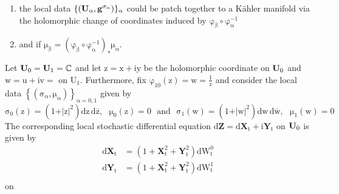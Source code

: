 \documentclass[10 pt,english]{smfart}
\newcommand{\Xt}{\mathrm{\mathbf{X}}_{t}}
\newcommand{\Yt}{\mathrm{\mathbf{Y}}_{t}}
\newcommand{\Z}{\mathrm{\mathbf{Z}}}
\newcommand{\g}{\mathrm{\mathbf{g}}}
\newcommand{\U}{{\bf{U}}}
\begin{document}
\begin{enumerate}
\item the local data $\mathrm{\{\left(\U_{\alpha},\g^{\sigma_{\alpha}}\right)\}_{\alpha}}$ could be patch together to a K\"ahler manifold via the holomorphic change of coordinates induced by $\mathrm{\varphi_{\beta}\circ\varphi^{-1}_{\alpha}}$ 
\item and if $\mathrm{\mu_{\beta}= \left(\varphi_{\beta}\circ\varphi^{-1}_{\alpha}\right)_{*}\mu_{\alpha}}$.
\end{enumerate}

\begin{exem} Let $\mathrm{\U_{0}=\U_{1}=\mathbb{C}}$ and let $\mathrm{z=x+iy}$ be the holomorphic coordinate on $\mathrm{\U_{0}}$ and $\mathrm{w=u+iv=}$ on $\mathrm{U_{1}}$. Furthermore, fix $\mathrm{\varphi_{10}\left(z\right)=w=\frac{1}{z}}$ and consider the local data $\mathrm{\left\{(\sigma_{\alpha},\mu_{\alpha})\right\}_{\alpha=0,1}}$ given by
\begin{equation}
\mathrm{\sigma_{0}\left(z\right)=\left(1+\vert z\vert^2\right)dz\,d\overline{z},\,\,\,\,\mu_{0}(z)=0\,\,\,\, and\,\,\,\, \sigma_{1}\left(w\right)=\left(1+\vert w\vert^2\right)dw\,d\overline{w},\,\,\,\, \mu_{1}(w)=0}
\end{equation} The corresponding local stochastic differential equation $\mathrm{d\Z=d\Xt+i\Yt}$ on $\mathrm{\U_{0}}$ is given by 
\begin{equation}
\begin{split}
\mathrm{d\mathbf{X}_{t}}&=\mathrm{\left(1+\mathbf{X}_{t}^{2}+\mathbf{Y}_{t}^{2}\right)dW^{0}_{t}}\\
\mathrm{d\mathbf{Y}_{t}}&=\mathrm{\left(1+\mathbf{X}_{t}^{2}+\mathbf{Y}_{t}^{2}\right)dW^{1}_{t}}\\
\end{split}
\end{equation} on 

\end{exem}
\end{document}
